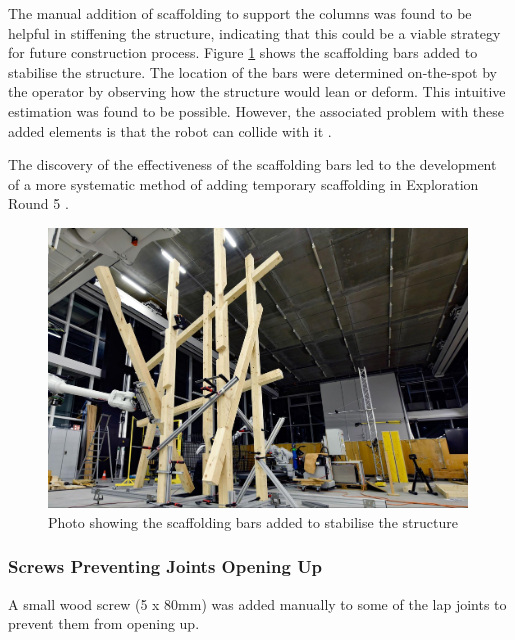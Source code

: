 The manual addition of scaffolding to support the columns was found to be helpful in stiffening the structure, indicating that this could be a viable strategy for future construction process. Figure \ref{fig:scaffolding-bars-2} shows the scaffolding bars added to stabilise the structure. The location of the bars were determined on-the-spot by the operator by observing how the structure would lean or deform. This intuitive estimation was found to be possible. However, the associated problem with these added elements is that the robot can collide with it .

The discovery of the effectiveness of the scaffolding bars led to the development of a more systematic method of adding temporary scaffolding in Exploration Round 5 .

\begin{figure}[!h]
    \centering
    \includegraphics[width=0.99\textwidth]{images/6b/img06.jpg}
    \caption{Photo showing the scaffolding bars added to stabilise the structure}
    \label{fig:scaffolding-bars-2}
\end{figure}

\subsubsection{Screws Preventing Joints Opening Up}
\label{subsubsection:exploration-3-screws-preventing-joints-opening-up}

A small wood screw (5 x 80mm) was added manually to some of the lap joints to prevent them from opening up. 

